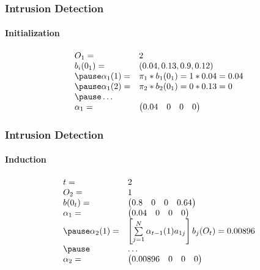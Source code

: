 \documentclass{beamer}
\begin{document}
\begin{frame}
  \frametitle{Intrusion Detection}
  \framesubtitle{Initialization}
  \pause
  $$
  \begin{array}{ll}
    O_1 =& 2 \\
    b_i(0_1) =& (0.04, 0.13, 0.9, 0.12)\\ \pause
    \alpha_1(1) =& \pi_1 * b_1(0_1) = 1 * 0.04 = 0.04 \\ \pause
    \alpha_1(2) =& \pi_2 * b_2(0_1) =0 * 0.13 = 0 \\ \pause
    \ldots \\
    \alpha_1 =& \begin{pmatrix} 0.04 & 0 & 0 & 0\end{pmatrix}
  \end{array}
  $$
\end{frame}
\begin{frame}
  \frametitle{Intrusion Detection}
  \framesubtitle{Induction}
  \pause
  $$
  \begin{array}{ll}
    t= & 2\\
    O_2 =& 1 \\
    b(0_t) =& \begin{pmatrix}0.8& 0& 0& 0.64\end{pmatrix}\\
    \alpha_1 =& \begin{pmatrix} 0.04 & 0 & 0 & 0\end{pmatrix}\\ \pause
    \alpha_2(1) =& \left[ \sum\limits_{j=1}^N\alpha_{t-1}(1)a_{1j}\right] b_j
                   (O_t) = 0.00896 \\ \pause
       & \ldots \\
    \alpha_2 =& \begin{pmatrix} 0.00896 & 0 & 0 & 0\end{pmatrix}\\
  
  \end{array}
  $$
\end{frame}
\end{document}
